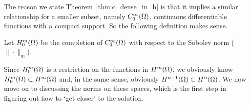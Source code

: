 The reason we state Theorem~\ref{thm:c_dense_in_h} is that it implies a 
similar relationship for a smaller subset, namely $C^\infty_0(\Omega)$, 
continuous differentiable functions with a compact support. So the following 
definition makes sense.
\begin{defn}{\quad}
  Let $H_0^m(\Omega)$ be the completion of $C^\infty_0(\Omega)$ with respect 
  to the Sobolev norm
 ($\| \cdot \|_m$).
\end{defn} 
Since $H_0^m(\Omega)$ is a restriction on the functions in $H^m(\Omega)$, 
we obviously know $H_0^m(\Omega) \subset H^m(\Omega)$ and, in the same 
sense, obviously $H^{n+1}(\Omega) \subset H^n(\Omega)$.
We now move on to discussing the norms on these spaces, 
which is the first step in figuring out how to `get closer' to 
the solution.